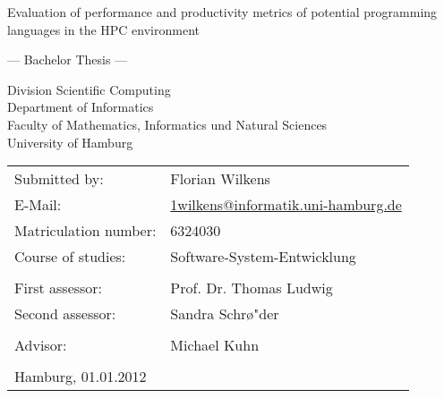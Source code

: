 \documentclass[
	12pt,
	a4paper,
	BCOR10mm,
	DIV14,
	listof=totoc,
	bibliography=totoc,
	headsepline
]{scrreprt}
\begin{document}
\begin{titlepage}
	\begin{center}
		{\titlefont\huge Evaluation of performance and productivity metrics of
			potential programming languages in the HPC environment \par}

		\bigskip
		\bigskip

		{\titlefont\Large --- Bachelor Thesis ---\par}

		\bigskip
		\bigskip

		{\large Division Scientific Computing \\
		Department of Informatics\\
		Faculty of Mathematics, Informatics und Natural Sciences\\
		University of Hamburg\par}
	\end{center}

	\vfill

	{\large \begin{tabular}{ll}
		Submitted by: & Florian Wilkens \\
		E-Mail: & \href{mailto:1wilkens@informatik.uni-hamburg.de}
			{1wilkens@informatik.uni-hamburg.de} \\
		Matriculation number: & 6324030 \\
		Course of studies: & Software-System-Entwicklung \\
		\\
		First assessor: & Prof. Dr. Thomas Ludwig \\
		Second assessor: & Sandra Schr\o"der \\ \\
		Advisor: & Michael Kuhn \\
		\\
		Hamburg, 01.01.2012
	\end{tabular}\par}
\end{titlepage}



\tableofcontents 				  %






\end{document}
